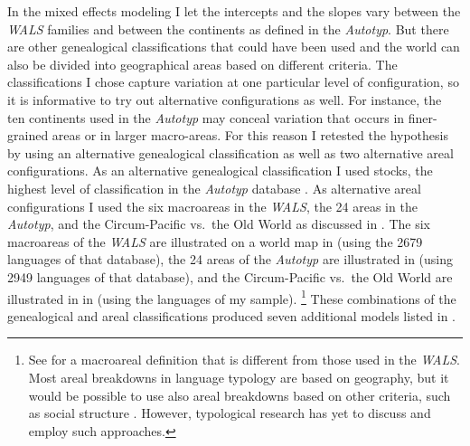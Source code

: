 \documentclass[output=collectionpaper]{langsci/langscibook}
\begin{document}
In the mixed effects modeling I let the intercepts and the slopes vary between the \textit{WALS} families and between the continents as defined in the \textit{Autotyp}. But there are other genealogical classifications that could have been used and the world can also be divided into geographical areas based on different criteria. The classifications I chose capture variation at one particular level of configuration, so it is informative to try out alternative configurations as well. For instance, the ten continents used in the \textit{Autotyp} may conceal variation that occurs in finer-grained areas or in larger macro-areas. For this reason I retested the hypothesis by using an alternative genealogical classification as well as two alternative areal configurations. As an alternative genealogical classification I used stocks, the highest level of classification in the \textit{Autotyp} database \citep{Bickel2017}. As alternative areal configurations I used the six macroareas in the \textit{WALS}, the 24 areas in the \textit{Autotyp}, and the Circum-Pacific vs.\ the Old World as discussed in . The six macroareas of the \textit{WALS} are illustrated on a world map in  (using the 2679 languages of that database), the 24 areas of the \textit{Autotyp} are illustrated in  (using 2949 languages of that database), and the Circum-Pacific vs.\ the Old World are illustrated in  in  (using the languages of my sample).%
\footnote{See \citealt{Hammarstroem2014} for a macroareal definition that is different from those used in the \textit{WALS}. Most areal breakdowns in language typology are based on geography, but it would be possible to use also areal breakdowns based on other criteria, such as social structure \citep{Burton1996}. However, typological research has yet to discuss and employ such approaches.} These combinations of the genealogical and areal classifications produced seven additional models listed in .
\end{document}
